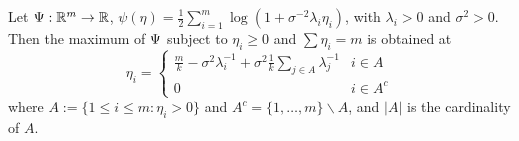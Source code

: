 \begin{proposition}\label{prop:kkt}
  Let $\Psi: \mathbb{R}^m \to \mathbb{R}$, $\psi(\eta) =
  \frac{1}{2}\sum_{i=1}^m \log (1+\sigma^{-2}\lambda_i \eta_i)$, with
  $\lambda_i > 0$ and $\sigma^{2} > 0$. Then the maximum of $\Psi$
  subject to $\eta_i \geq 0$ and $\sum\eta_i = m$ is obtained at
  \begin{equation}
  \eta_i = \begin{cases}
    \frac{m}{k} - \sigma^2 \lambda_i^{-1} + \sigma^2 \frac{1}{k} \sum_{j\in A} \lambda_j^{-1} & i \in A \\
    0 & i \in A^c
  \end{cases}
  \end{equation}
  where $A:= \{1\leq i \leq m: \eta_i > 0\}$ and $A^c = \{1,\dots, m\}
    \backslash A$, and $|A|$ is the cardinality of $A$.
\end{proposition}
